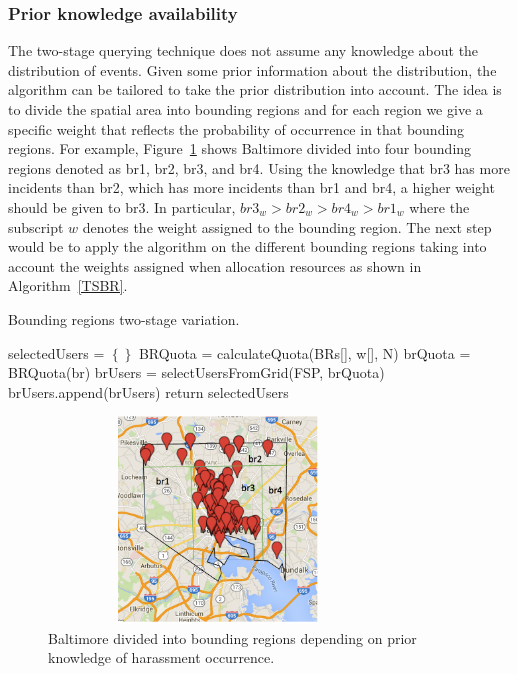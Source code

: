 \documentclass{acm_proc_article-sp}
\begin{document}
\subsubsection{Prior knowledge availability}
The two-stage querying technique does not assume any knowledge about the distribution of events. Given some prior information about the distribution, the algorithm can be tailored to take the prior distribution into account. The idea is to divide the spatial area into bounding regions and for each region we give a specific weight that reflects the probability of occurrence in that bounding regions.
For example, Figure~\ref{fig: BaltimoreRegions} shows Baltimore divided into four bounding regions denoted as br1, br2, br3, and br4. Using the knowledge that br3 has more incidents than br2, which has more incidents than br1 and br4, a higher weight should be given to br3. In particular, $br3_w > br2_w> br4_w> br1_w$ where the subscript $w$ denotes the weight assigned to the bounding region. The next step would be to apply the algorithm on the different bounding regions taking into account the weights assigned when allocation resources as shown in Algorithm~\ref{TSBR}.
\begin{algorithm}
\caption{Bounding regions two-stage variation.}
\label{TSBR}
\begin{algorithmic}[1]
    \State selectedUsers = $\left\{\right\}$
     \State BRQuota = calculateQuota(BRs[], w[], N)
      \State brQuota = BRQuota(br)
    \State brUsers = selectUsersFromGrid(FSP, brQuota)
    \State brUsers.append(brUsers)
  \EndFor
\State return {selectedUsers}
\EndFunction
\end{algorithmic}
\end{algorithm}
\begin{figure}[!h]
\centering
\includegraphics[width=9cm ,height=5.5cm]{figuresPng/BaltimoreBr.png}
\caption{Baltimore divided into bounding regions depending on prior knowledge of harassment occurrence.}
\label{fig: BaltimoreRegions}
\end{figure}
\end{document}
